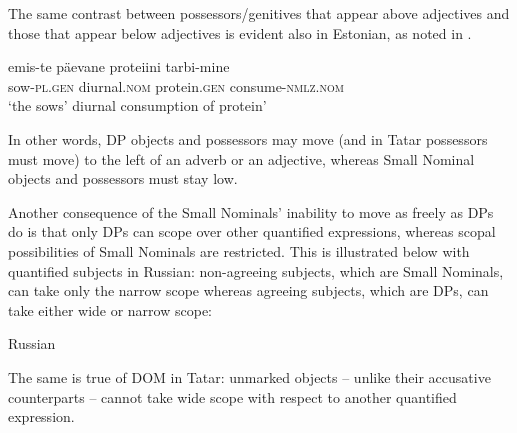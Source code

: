 \documentclass[output=paper]{langsci/langscibook}
\begin{document}
The same contrast between possessors/genitives that appear above adjectives and those that appear below adjectives is evident also in Estonian, 
as noted in \citet{Norris2018}.

\ea%
    \label{pereex:19}
    \gll emis-te   päevane   proteiini   tarbi-mine\\
    sow-\textsc{pl.gen}   diurnal.\textsc{nom}   protein.\textsc{gen}   consume-\textsc{nmlz.nom} \\
    \glt `the sows’ diurnal consumption of protein'
\z

In other words, DP objects and possessors may move (and in Tatar possessors must move) to the left of an adverb or an adjective, 
whereas Small Nominal objects and possessors must stay low.\largerpage

Another consequence of the Small Nominals’ inability to move as freely as DPs do is that only DPs can scope over other quantified expressions, 
whereas scopal possibilities of Small Nominals are restricted. 
This is illustrated below with quantified subjects in Russian: 
non-agreeing subjects, which are Small Nominals, can take only the narrow scope 
whereas agreeing subjects, which are DPs, can take either wide or narrow scope:

\ea%
    \label{pereex:20}
    Russian 
    \z 
\z

The same is true of DOM in Tatar: 
unmarked objects -- unlike their accusative counterparts -- cannot take wide scope with respect to another quantified expression.
\end{document}
